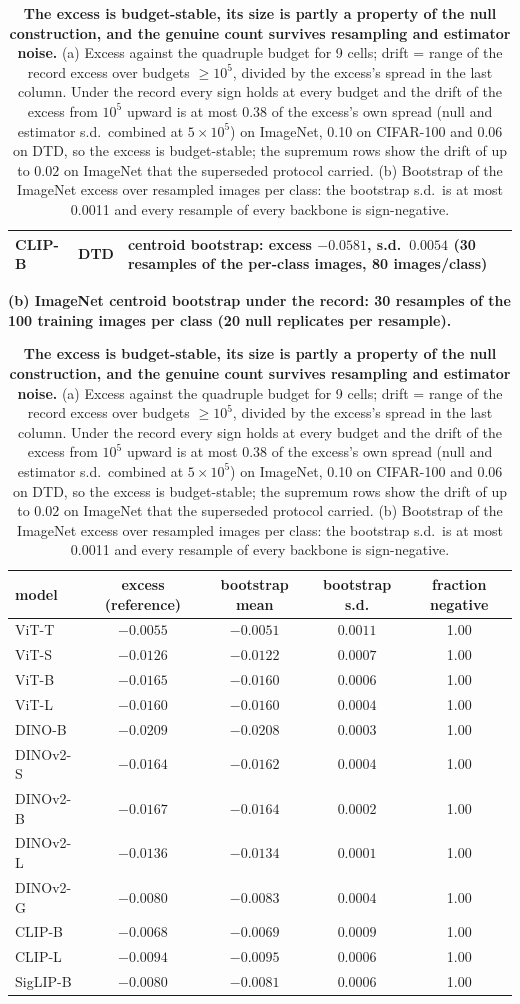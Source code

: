 \begin{table}[H]
\begin{tabular}{llccccccc|cc}
CLIP-B & DTD & \multicolumn{9}{l}{centroid bootstrap: excess $-0.0581$, s.d.\ $0.0054$ (30 resamples of the per-class images, 80 images/class)} \\
\bottomrule
\end{tabular}
\par\vspace{5pt}
\endgroup
\begingroup
\noindent\textbf{(b) ImageNet centroid bootstrap under the record: 30 resamples of the 100 training images per class (20 null replicates per resample).}\par\vspace{1.5pt}
\footnotesize
\setlength{\tabcolsep}{4pt}
\begin{tabular}{lcccc}
\toprule
model & excess (reference) & bootstrap mean & bootstrap s.d. & fraction negative \\
\midrule
ViT-T & $-0.0055$ & $-0.0051$ & $0.0011$ & 1.00 \\
ViT-S & $-0.0126$ & $-0.0122$ & $0.0007$ & 1.00 \\
ViT-B & $-0.0165$ & $-0.0160$ & $0.0006$ & 1.00 \\
ViT-L & $-0.0160$ & $-0.0160$ & $0.0004$ & 1.00 \\
\midrule
DINO-B & $-0.0209$ & $-0.0208$ & $0.0003$ & 1.00 \\
DINOv2-S & $-0.0164$ & $-0.0162$ & $0.0004$ & 1.00 \\
DINOv2-B & $-0.0167$ & $-0.0164$ & $0.0002$ & 1.00 \\
DINOv2-L & $-0.0136$ & $-0.0134$ & $0.0001$ & 1.00 \\
DINOv2-G & $-0.0080$ & $-0.0083$ & $0.0004$ & 1.00 \\
\midrule
CLIP-B & $-0.0068$ & $-0.0069$ & $0.0009$ & 1.00 \\
CLIP-L & $-0.0094$ & $-0.0095$ & $0.0006$ & 1.00 \\
SigLIP-B & $-0.0080$ & $-0.0081$ & $0.0006$ & 1.00 \\
\bottomrule
\end{tabular}
\par\vspace{5pt}
\endgroup
\caption{\textbf{The excess is budget-stable, its size is partly a property of the null construction, and the genuine count survives resampling and estimator noise.} (a) Excess against the quadruple budget for 9 cells; drift = range of the record excess over budgets $\ge10^5$, divided by the excess's spread in the last column. Under the record every sign holds at every budget and the drift of the excess from $10^5$ upward is at most 0.38 of the excess's own spread (null and estimator s.d.\ combined at $5{\times}10^5$) on ImageNet, 0.10 on CIFAR-100 and 0.06 on DTD, so the excess is budget-stable; the supremum rows show the drift of up to $0.02$ on ImageNet that the superseded protocol carried. (b) Bootstrap of the ImageNet excess over resampled images per class: the bootstrap s.d.\ is at most 0.0011 and every resample of every backbone is sign-negative. %
}
\label{tab:q8-robust}
\end{table}
